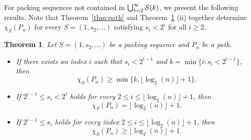 \documentclass[12pt]{article}
\newtheorem{theorem}{Theorem}[section]
\newcommand{\cS}{{\cal S}}
\begin{document}
For packing sequences not contained in $\bigcup_{k=2}^\infty \cS(k)$, we present the following results. Note that Theorem~\ref{thm:path} and Theorem~\ref{cor:path-lower-bound} (ii) together determine $\chi_S(P_n)$ for every $S=(1, s_2, \dots )$ satisfying $s_i <2^i$ for all $i \ge 2$.
\begin{theorem}
   \label{cor:path-lower-bound}
Let  $S=(1, s_2, \dots )$ be a packing sequence and $P_n$ be a path. 
\begin{itemize}
    \item[(i)] If there exists an index $i$ such that $s_i < 2^{i-1}$ and $k= \min\{ i \colon s_i < 2^{i-1}\}$, then 
   $$ \chi_S(P_n)\ge  \min \{k,\lfloor \log_2(n) \rfloor +1\}.
   $$    
   \item[(ii)] If $2^{i-1} \leq s_i < 2^i$ holds for every  $2 \le i \le \lfloor \log_2(n) \rfloor +1$, then $$ \chi_S(P_n)=  \lfloor \log_2(n) \rfloor +1.
   $$
   \item[(iii)] If $2^{i-1} \leq s_i $ holds for every  index $2 \le i \le \lfloor \log_2(n) \rfloor +1$, then $$ \chi_S(P_n)\ge   \lfloor \log_2(n) \rfloor +1.
   $$ 
   \end{itemize} 
   \end{theorem} 
\end{document}
